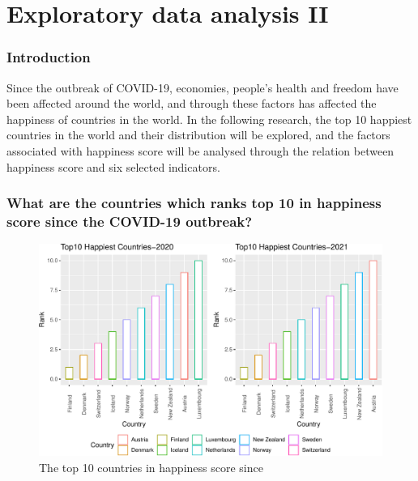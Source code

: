 \documentclass[11pt,a4paper,]{article}
\begin{document}
\hypertarget{exploratory-data-analysis-ii}{%
\section{Exploratory data analysis II}\label{exploratory-data-analysis-ii}}

\hypertarget{introduction-1}{%
\subsubsection{Introduction}\label{introduction-1}}

Since the outbreak of COVID-19, economies, people's health and freedom have been affected around the world, and through these factors has affected the happiness of countries in the world. In the following research, the top 10 happiest countries in the world and their distribution will be explored, and the factors associated with happiness score will be analysed through the relation between happiness score and six selected indicators.

\hypertarget{what-are-the-countries-which-ranks-top-10-in-happiness-score-since-the-covid-19-outbreak}{%
\subsubsection{What are the countries which ranks top 10 in happiness score since the COVID-19 outbreak?}\label{what-are-the-countries-which-ranks-top-10-in-happiness-score-since-the-covid-19-outbreak}}

\begin{figure}
\centering
\includegraphics{Assignment4_files/figure-latex/top10-1.pdf}
\caption{\label{fig:top10}The top 10 countries in happiness score since}
\end{figure}
\end{document}
